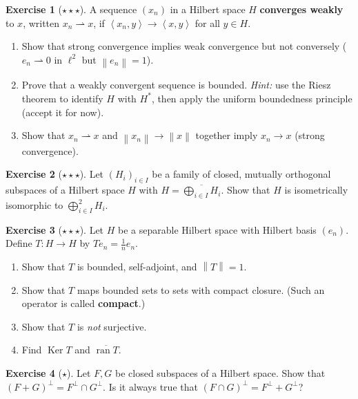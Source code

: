 \documentclass[a4paper,12pt]{book}
\DeclareMathOperator{\Ker}{Ker}
\DeclareMathOperator{\ran}{ran}
\newcommand{\norm}[1]{\left\| #1 \right\|}
\newcommand{\inner}[2]{\left\langle #1, #2 \right\rangle}
\newcommand{\weakto}{\rightharpoonup}
\theoremstyle{definition}
\newtheorem{exercise}{Exercise}[chapter]
\theoremstyle{plain}
\theoremstyle{remark}
\begin{document}
\begin{exercise}[$\star\star\star$]
\label{exo:weak-convergence-hilbert}
A sequence $(x_n)$ in a Hilbert space $H$ \textbf{converges weakly} to
$x$, written $x_n\weakto x$, if $\inner{x_n}{y}\to\inner{x}{y}$ for all
$y\in H$.
\begin{enumerate}[label=(\alph*)]
  \item Show that strong convergence implies weak convergence but not
        conversely ($e_n\weakto 0$ in $\ell^2$ but $\norm{e_n}=1$).
  \item Prove that a weakly convergent sequence is bounded.
        \textit{Hint:} use the Riesz theorem to identify $H$ with $H^*$,
        then apply the uniform boundedness principle (accept it for now).
  \item Show that $x_n\weakto x$ and $\norm{x_n}\to\norm{x}$ together
        imply $x_n\to x$ (strong convergence).
\end{enumerate}
\end{exercise}

\begin{exercise}[$\star\star\star$]
\label{exo:hilbert-sum-universal}
Let $(H_i)_{i\in I}$ be a family of closed, mutually orthogonal subspaces
of a Hilbert space $H$ with $H=\overline{\bigoplus_{i\in I}H_i}$.  Show
that $H$ is isometrically isomorphic to $\bigoplus_{i\in I}^2 H_i$.
\end{exercise}

\begin{exercise}[$\star\star\star$]
\label{exo:compact-operator-preview}
Let $H$ be a separable Hilbert space with Hilbert basis $(e_n)$.
Define $T:H\to H$ by $Te_n = \frac{1}{n}e_n$.
\begin{enumerate}[label=(\alph*)]
  \item Show that $T$ is bounded, self-adjoint, and $\norm{T}=1$.
  \item Show that $T$ maps bounded sets to sets with compact closure.
        (Such an operator is called \textbf{compact}.)
  \item Show that $T$ is \emph{not} surjective.
  \item Find $\Ker T$ and $\overline{\ran T}$.
\end{enumerate}
\end{exercise}

\begin{exercise}[$\star$]
\label{exo:perp-complement-sum}
Let $F,G$ be closed subspaces of a Hilbert space.  Show that
$(F+G)^\perp = F^\perp\cap G^\perp$.  Is it always true that
$(F\cap G)^\perp = F^\perp + G^\perp$?
\end{exercise}
\end{document}
